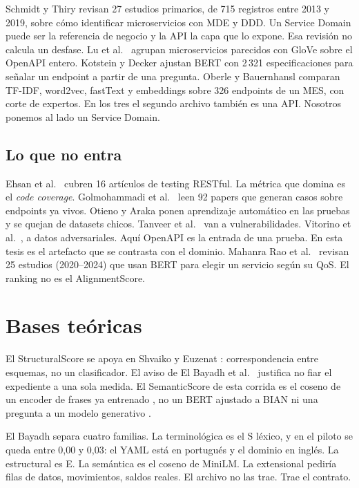 Schmidt y Thiry \cite{Schmidt2020} revisan 27 estudios primarios, de 715 registros entre 2013 y 2019, sobre cómo identificar microservicios con MDE y DDD. Un Service Domain puede ser la referencia de negocio y la API la capa que lo expone. Esa revisión no calcula un desfase. Lu et al.\ \cite{Lu2024} agrupan microservicios parecidos con GloVe sobre el OpenAPI entero. Kotstein y Decker \cite{Kotstein2024} ajustan BERT con 2\,321 especificaciones para señalar un endpoint a partir de una pregunta. Oberle y Bauernhansl \cite{Oberle2024} comparan TF-IDF, word2vec, fastText y embeddings sobre 326 endpoints de un MES, con corte de expertos. En los tres el segundo archivo también es una API. Nosotros ponemos al lado un Service Domain.

\subsection{Lo que no entra}

Ehsan et al.\ \cite{Ehsan2022} cubren 16 artículos de testing RESTful. La métrica que domina es el \textit{code coverage}. Golmohammadi et al.\ \cite{Golmohammadi2024} leen 92 papers que generan casos sobre endpoints ya vivos. Otieno y Araka \cite{Otieno2026} ponen aprendizaje automático en las pruebas y se quejan de datasets chicos. Tanveer et al.\ \cite{Tanveer2025} van a vulnerabilidades. Vitorino et al.\ \cite{Vitorino2025}, a datos adversariales. Aquí OpenAPI es la entrada de una prueba. En esta tesis es el artefacto que se contrasta con el dominio. Mahanra Rao et al.\ \cite{MahanraRao2025} revisan 25 estudios (2020--2024) que usan BERT para elegir un servicio según su QoS. El ranking no es el AlignmentScore.

\section{Bases teóricas}

El StructuralScore se apoya en Shvaiko y Euzenat \cite{Shvaiko2005}: correspondencia entre esquemas, no un clasificador. El aviso de El Bayadh et al.\ \cite{ElBayadh2015} justifica no fiar el expediente a una sola medida. El SemanticScore de esta corrida es el coseno de un encoder de frases ya entrenado \cite{Schneider2023,Reimers2019}, no un BERT ajustado a BIAN \cite{He2022} ni una pregunta a un modelo generativo \cite{Hertling2023}.

El Bayadh separa cuatro familias. La terminológica es el S léxico, y en el piloto se queda entre 0,00 y 0,03: el YAML está en portugués y el dominio en inglés. La estructural es E. La semántica es el coseno de MiniLM. La extensional pediría filas de datos, movimientos, saldos reales. El archivo no las trae. Trae el contrato.


